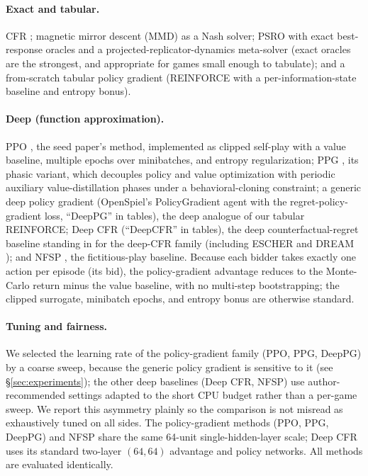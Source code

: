 \documentclass[11pt,a4paper]{article}
\begin{document}
\paragraph{Exact and tabular.} CFR \citep{cfr2007}; magnetic mirror descent (MMD)
\citep{mmd2023} as a Nash solver; PSRO \citep{psro2017} with exact best-response
oracles and a projected-replicator-dynamics meta-solver (exact oracles are the
strongest, and appropriate for games small enough to tabulate); and a from-scratch
tabular policy gradient (REINFORCE with a per-information-state baseline and entropy bonus).

\paragraph{Deep (function approximation).} PPO \citep{ppo2017}, the seed paper's
method, implemented as clipped self-play with a value baseline, multiple epochs over
minibatches, and entropy regularization; PPG \citep{ppg2021}, its phasic variant,
which decouples policy and value optimization with periodic auxiliary value-distillation
phases under a behavioral-cloning constraint; a generic deep policy gradient
(OpenSpiel's PolicyGradient agent with the regret-policy-gradient loss, ``DeepPG''
in tables), the deep analogue of our tabular REINFORCE; Deep CFR \citep{deepcfr2019}
(``DeepCFR'' in tables), the deep counterfactual-regret baseline standing in for the
deep-CFR family (including ESCHER \citealp{escher2022} and DREAM \citealp{dream2020});
and NFSP \citep{nfsp2016}, the fictitious-play baseline. Because each bidder takes exactly one
action per episode (its bid), the policy-gradient advantage reduces to the Monte-Carlo
return minus the value baseline, with no multi-step bootstrapping; the clipped surrogate,
minibatch epochs, and entropy bonus are otherwise standard.

\paragraph{Tuning and fairness.} We selected the learning rate of the
policy-gradient family (PPO, PPG, DeepPG) by a coarse sweep, because the generic
policy gradient is sensitive to it (see \S\ref{sec:experiments}); the other deep
baselines (Deep CFR, NFSP) use author-recommended settings adapted to the short CPU
budget rather than a per-game sweep. We report this asymmetry plainly so the
comparison is not misread as exhaustively tuned on all sides. The policy-gradient
methods (PPO, PPG, DeepPG) and NFSP share the same 64-unit single-hidden-layer scale;
Deep CFR uses its standard two-layer $(64, 64)$ advantage and policy networks. All
methods are evaluated identically.
\end{document}

